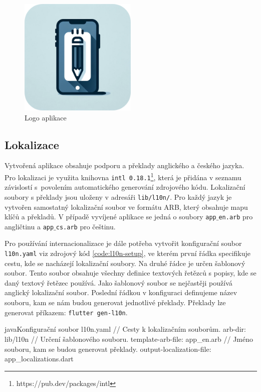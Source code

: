 \documentclass[czech, bc, kiv, he, iso690numb]{fasthesis}
\begin{document}
\begin{figure}[h!]
  \centering
  \includegraphics[width=0.5\textwidth]{img/BP-Runt/Implementation/note_taking_app_logo.png}
  \caption{Logo aplikace}
  \label{fig:logo}
\end{figure}

\subsection{Lokalizace}

Vytvořená aplikace obsahuje podporu a překlady anglického a českého jazyka. Pro lokalizaci je využita knihovna \texttt{intl 0.18.1}\footnote{https://pub.dev/packages/intl}, která je přidána v seznamu závislostí s~povolením automatického generování zdrojového kódu. Lokalizační soubory s překlady jsou uloženy v adresáři \texttt{lib/l10n/}. Pro každý jazyk je vytvořen samostatný lokalizační soubor ve formátu \gls{ARB}, který obsahuje mapu klíčů a překladů. V případě vyvíjené aplikace se jedná o soubory \texttt{app$\_$en.arb} pro angličtinu a \texttt{app$\_$cs.arb} pro češtinu. 

Pro používání internacionalizace je dále potřeba vytvořit konfigurační soubor \texttt{l10n.yaml} viz zdrojový kód \ref{code:l10n-setup}, ve kterém první řádka specifikuje cestu, kde se nacházejí lokalizační soubory. Na druhé řádce je určen šablonový soubor. Tento soubor obsahuje všechny definice textových řetězců s popisy, kde se daný textový řetězec používá. Jako šablonový soubor se nejčastěji používá anglický lokalizační soubor. Poslední řádkou v konfiguraci definujeme název souboru, kam se nám budou generovat jednotlivé překlady. Překlady lze generovat příkazem: \texttt{flutter gen-l10n}.

\begin{code}{java}{Konfigurační soubor l10n.yaml \label{code:l10n-setup}}
// Cesty k lokalizačním souborům.
arb-dir: lib/l10n
// Určení šablonového souboru.
template-arb-file: app_en.arb
// Jméno souboru, kam se budou generovat překlady.
output-localization-file: app_localizations.dart
\end{code}
\end{document}
